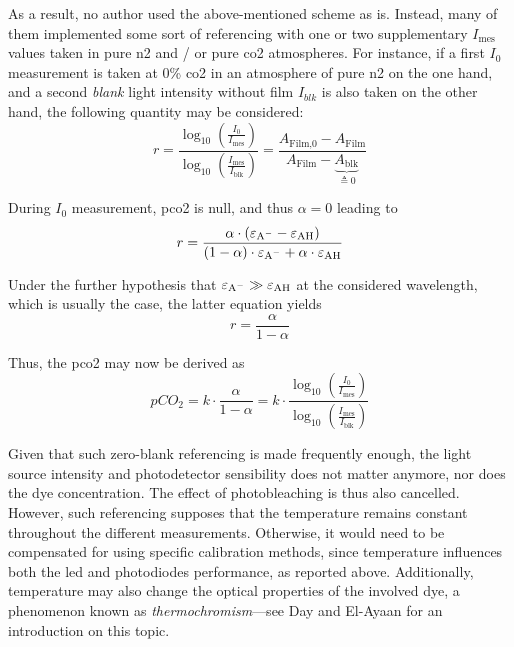 As a result, no author used the above-mentioned scheme as is. Instead, many of them\cite{opitz1984, zhujun1984b, wolfbeis1988, he1995, marazuela1995, malins1998, wolfbeis1998, chu2008, chu2009, dansby2010, chu2017} implemented some sort of referencing with one or two supplementary $I_\text{mes}$ values taken in pure \gls{n2} and / or pure \gls{co2} atmospheres. For instance, if a first $I_{0}$ measurement is taken at 0\% \gls{co2} in an atmosphere of pure \gls{n2} on the one hand, and a second \emph{blank} light intensity without film $I_{blk}$ is also taken on the other hand, the following quantity may be considered:
\begin{equation}
	r = \frac{\log_{10}\left(\frac{I_0}{I_\text{mes}}\right)}{\log_{10}\left(\frac{I_\text{mes}}{I_\text{blk}}\right)} = \frac{A_\text{Film,0} - A_\text{Film}}{A_\text{Film} - \underbrace{A_\text{blk}}_{\triangleq 0}}
\end{equation}

During $I_{0}$ measurement, \gls{pco2} is null, and thus $\alpha = 0$ leading to
\begin{equation}
	r = \frac{\alpha \cdot (\ce{\varepsilon_{A^-} - \varepsilon_{AH}})}{(1-\alpha)\cdot \ce{\varepsilon_{A^-} + \alpha\cdot \varepsilon_{AH}}}
\end{equation}

Under the further hypothesis that $\ce{\varepsilon_{A^-}} \gg \ce{\varepsilon_{AH}}$ at the considered wavelength, which is usually the case\cite{segawa2003, mills2009}, the latter equation yields
\begin{equation}
	r = \frac{\alpha}{1-\alpha}
\end{equation}

Thus, the \gls{pco2} may now be derived as
\begin{equation}
	pCO_2 = k \cdot \frac{\alpha}{1-\alpha} = k\cdot \frac{\log_{10}\left(\frac{I_0}{I_\text{mes}}\right)}{\log_{10}\left(\frac{I_\text{mes}}{I_\text{blk}}\right)}
\end{equation}

Given that such zero-blank referencing is made frequently enough, the light source intensity and photodetector sensibility does not matter anymore, nor does the dye concentration. The effect of photobleaching is thus also cancelled. However, such referencing supposes that the temperature remains constant throughout the different measurements. Otherwise, it would need to be compensated for using specific calibration methods, since temperature influences both the \gls{led} and photodiodes performance, as reported above. Additionally, temperature may also change the optical properties of the involved dye, a phenomenon known as \emph{thermochromism}---see Day and El-Ayaan for an introduction on this topic\cite{day1963, elayaan2001}.


